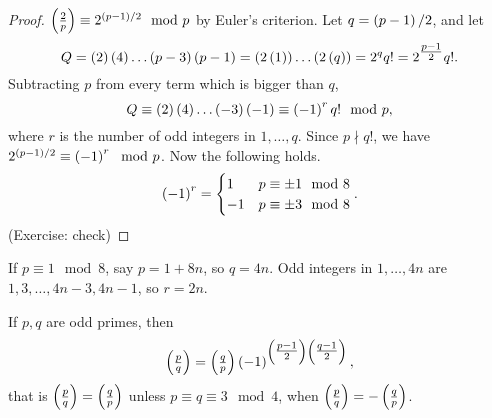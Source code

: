 \begin{proof}
$ \left( \tfrac{2}{p} \right) \equiv 2^{\left( p - 1 \right) / 2} \mod p $ by Euler's criterion. Let $ q = \left( p - 1 \right) / 2 $, and let
$$ Q = \left( 2 \right)\left( 4 \right) \dots \left( p - 3 \right)\left( p - 1 \right) = \left( 2\left( 1 \right) \right) \dots \left( 2\left( q \right) \right) = 2^qq! = 2^{\tfrac{p - 1}{2}}q!. $$
Subtracting $ p $ from every term which is bigger than $ q $,
$$ Q \equiv \left( 2 \right)\left( 4 \right) \dots \left( -3 \right)\left( -1 \right) \equiv \left( -1 \right)^rq! \mod p, $$
where $ r $ is the number of odd integers in $ 1, \dots, q $. Since $ p \nmid q! $, we have $ 2^{\left( p - 1 \right) / 2} \equiv \left( -1 \right)^r \mod p $. Now the following holds.
$$ \left( -1 \right)^r =
\begin{cases}
1 & p \equiv \pm 1 \mod 8 \\
-1 & p \equiv \pm 3 \mod 8
\end{cases}.
$$
(Exercise: check)
\end{proof}

\begin{example2}
If $ p \equiv 1 \mod 8 $, say $ p = 1 + 8n $, so $ q = 4n $. Odd integers in $ 1, \dots, 4n $ are $ 1, 3, \dots, 4n - 3, 4n - 1 $, so $ r = 2n $.
\end{example2}

\begin{theorem}
\label{thm:40}
If $ p, q $ are odd primes, then
$$ \left( \tfrac{p}{q} \right) = \left( \tfrac{q}{p} \right)\left( -1 \right)^{\left( \tfrac{p - 1}{2} \right)\left( \tfrac{q - 1}{2} \right)}, $$
that is $ \left( \tfrac{p}{q} \right) = \left( \tfrac{q}{p} \right) $ unless $ p \equiv q \equiv 3 \mod 4 $, when $ \left( \tfrac{p}{q} \right) = -\left( \tfrac{q}{p} \right) $.
\end{theorem}

